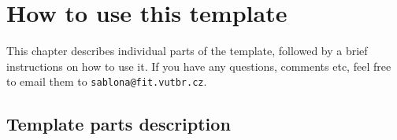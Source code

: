 
%






\chapter{How to use this template}
\label{jak}

This chapter describes individual parts of the template, followed by a brief instructions on how to use it. If you have any questions, comments etc, feel free to email them to \texttt{sablona@fit.vutbr.cz}.

\section*{Template parts description}

